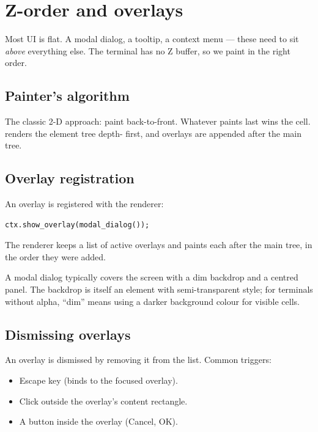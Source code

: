 \chapter{Z-order and overlays}
\label{ch:zorder}

\begin{aside}
Most UI is flat. A modal dialog, a tooltip, a context menu ---
these need to sit \emph{above} everything else. The terminal
has no Z buffer, so we paint in the right order.
\end{aside}

\section{Painter's algorithm}

The classic 2-D approach: paint back-to-front. Whatever paints
last wins the cell. \maya{} renders the element tree depth-
first, and overlays are appended after the main tree.

\section{Overlay registration}

An overlay is registered with the renderer:

\begin{lstlisting}
ctx.show_overlay(modal_dialog());
\end{lstlisting}

The renderer keeps a list of active overlays and paints each
after the main tree, in the order they were added.

A modal dialog typically covers the screen with a dim
backdrop and a centred panel. The backdrop is itself an
element with semi-transparent style; for terminals without
alpha, ``dim'' means using a darker background colour for
visible cells.

\section{Dismissing overlays}

An overlay is dismissed by removing it from the list. Common
triggers:

\begin{itemize}[leftmargin=*]
  \item Escape key (binds to the focused overlay).
  \item Click outside the overlay's content rectangle.
  \item A button inside the overlay (Cancel, OK).
\end{itemize}

